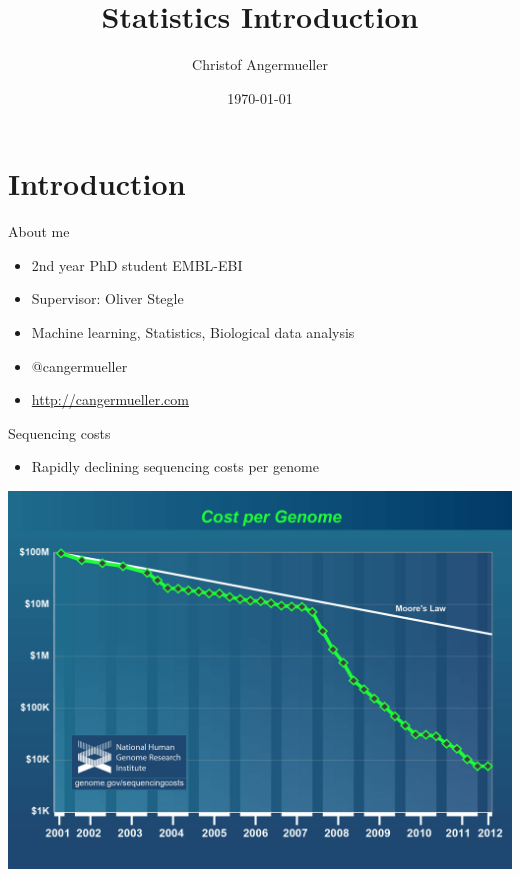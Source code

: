 \documentclass{beamer}\usepackage[]{graphicx}\usepackage[]{color}
\author{Christof Angermueller}
\title{Statistics Introduction}
\date{\today}
\begin{document}
\begin{frame}
  \titlepage
\end{frame}

\begin{frame}
  \tableofcontents
\end{frame}



\section{Introduction}

\begin{frame}{About me}
  \begin{itemize}
    \item 2nd year PhD student EMBL-EBI
    \item Supervisor: Oliver Stegle
    \item Machine learning, Statistics, Biological data analysis
    \item @cangermueller
    \item \url{http://cangermueller.com}
  \end{itemize}
\end{frame}

\begin{frame}{Sequencing costs}
  \begin{itemize}
    \item Rapidly declining sequencing costs per genome
  \end{itemize}
  \begin{center}
    \includegraphics[width=.8\linewidth]{costs_genome.jpg}
  \end{center}
\end{frame}
\end{document}
